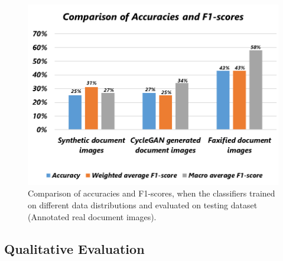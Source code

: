 \vspace*{1.5cm}
\begin{figure}[H]
        \begin{center}
	    \includegraphics[scale=0.60]{images/Evaluation/ComparisonOfAccuracyAndF1Score.png}
	    \caption[Comparison of accuracies and F1-scores, when the classifiers trained on different data distributions and evaluated on testing dataset (Annotated real document images).]{Comparison of accuracies and F1-scores, when the classifiers trained on different data distributions and evaluated on testing dataset (Annotated real document images).}
	    \label{fig:ComparisonOfAccuracyAndF1Score}
	    \end{center}
\end{figure}




\subsection{Qualitative Evaluation}\label{QualitativeResults}




